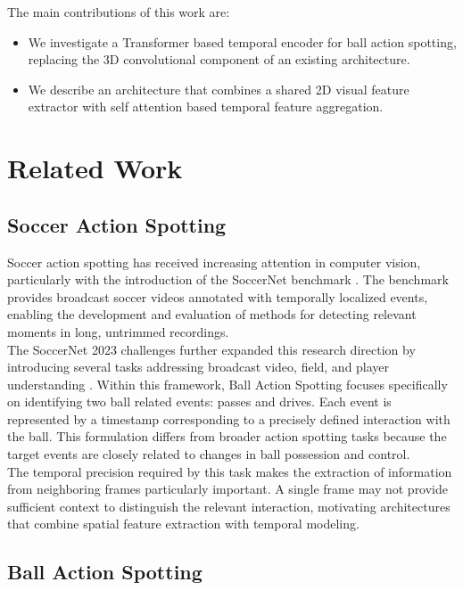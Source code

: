 \documentclass[conference]{IEEEtran}
\begin{document}
The main contributions of this work are:
\begin{itemize}
    \item We investigate a Transformer based temporal
    encoder for ball action spotting, replacing the
    3D convolutional component of an existing architecture.

    \item We describe an architecture that combines
    a shared 2D visual feature extractor with
    self attention based temporal feature aggregation.

\end{itemize}
\section{Related Work}
\subsection{Soccer Action Spotting}

Soccer action spotting has received increasing attention in computer vision, particularly with the introduction of the SoccerNet benchmark \cite{Cioppa_2024,deliège2021soccernetv2datasetbenchmarksholistic}. The benchmark provides broadcast soccer videos annotated with temporally localized events, enabling the development and evaluation of methods for detecting relevant moments in long, untrimmed recordings.\\
The SoccerNet 2023 challenges further expanded this research direction by introducing several tasks addressing broadcast video, field, and player understanding \cite{Cioppa_2024}. Within this framework, Ball Action Spotting focuses specifically on identifying two ball related events: passes and drives. Each event is represented by a timestamp corresponding to a precisely defined interaction with the ball. This formulation differs from broader action spotting tasks because the target events are closely related to changes in ball possession and control.\\
The temporal precision required by this task makes the extraction of information from neighboring frames particularly important. A single frame may not provide sufficient context to distinguish the relevant interaction, motivating architectures that combine spatial feature extraction with temporal modeling.

\subsection{Ball Action Spotting}
\end{document}
